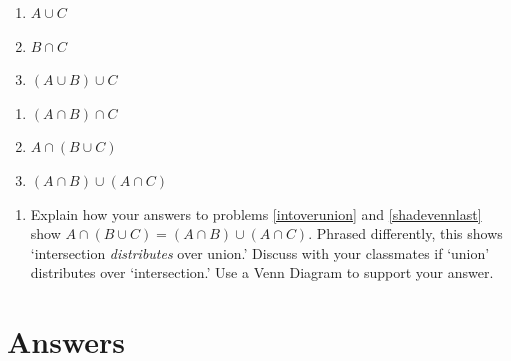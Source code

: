 \documentclass[11pt]{article}
\theoremstyle{definition}  %
\newcounter{HW}
\begin{document}
\begin{multicols}{3}
\begin{enumerate}
\setcounter{enumi}{\value{HW}}

\item  $A \cup C$ \label{shadevennfirst}

\item  $B \cap C$

\item  $(A \cup B) \cup C$



\setcounter{HW}{\value{enumi}}
\end{enumerate}
\end{multicols}

\begin{multicols}{3}
\begin{enumerate}
\setcounter{enumi}{\value{HW}}

\item  $(A \cap B) \cap C$ 

\item  $A \cap (B \cup C)$ \label{intoverunion}

\item  $(A \cap B) \cup (A \cap C)$ \label{shadevennlast}

\setcounter{HW}{\value{enumi}}
\end{enumerate}
\end{multicols}

\begin{enumerate}
\setcounter{enumi}{\value{HW}}

\item  Explain how your answers to problems \ref{intoverunion} and \ref{shadevennlast} show $A \cap (B \cup C) = (A \cap B) \cup (A \cap C)$.  Phrased differently, this shows `intersection \textit{distributes} over union.'  Discuss with your classmates if  `union' distributes over `intersection.'  Use a Venn Diagram to support your answer.

\setcounter{HW}{\value{enumi}}
\end{enumerate}

\newpage

\section{Answers}
\end{document}
